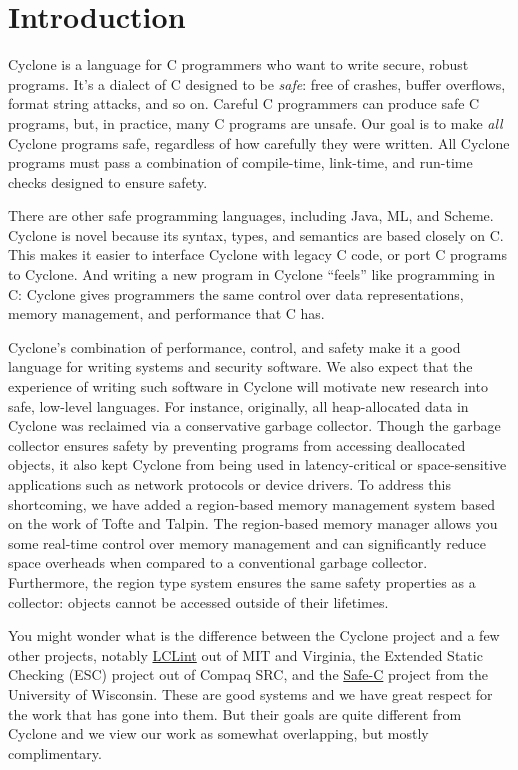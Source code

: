 \section{Introduction}
Cyclone is a language for C programmers who want to write secure,
robust programs.  It's a dialect of C designed to be \emph{safe}: free
of crashes, buffer overflows, format string attacks, and so on.
Careful C programmers can produce safe C programs, but, in practice,
many C programs are unsafe.  Our goal is to make \emph{all} Cyclone
programs safe, regardless of how carefully they were written.  All
Cyclone programs must pass a combination of compile-time, link-time,
and run-time checks designed to ensure safety.

There are other safe programming languages, including Java, ML, and
Scheme.  Cyclone is novel because its syntax, types, and semantics are
based closely on C\@.  This makes it easier to interface Cyclone with
legacy C code, or port C programs to Cyclone.  And writing a new
program in Cyclone ``feels'' like programming in C: Cyclone gives
programmers the same control over data representations, memory
management, and performance that C has.

Cyclone's combination of performance, control, and safety make it a
good language for writing systems and security software.  We also
expect that the experience of writing such software in Cyclone will
motivate new research into safe, low-level languages.  For instance,
originally, all heap-allocated data in Cyclone was reclaimed via a
conservative garbage collector.  Though the garbage collector ensures
safety by preventing programs from accessing deallocated objects, it
also kept Cyclone from being used in latency-critical or
space-sensitive applications such as network protocols or device
drivers.  To address this shortcoming, we have added a region-based
memory management system based on the work of Tofte and Talpin.  The
region-based memory manager allows you some real-time control over
memory management and can significantly reduce space overheads when
compared to a conventional garbage collector.  Furthermore, the region
type system ensures the same safety properties as a collector: objects
cannot be accessed outside of their lifetimes.

You might wonder what is the difference between the Cyclone project
and a few other projects, notably
\href{http://lclint.cs.virginia.edu/}{LCLint} out of MIT and Virginia,
the Extended Static Checking (ESC) project out of Compaq SRC, and the
\href{http://www.cs.wisc.edu/~austin/scc.html}{Safe-C} project from
the University of Wisconsin.  These are good systems and we have great
respect for the work that has gone into them.  But their goals are
quite different from Cyclone and we view our work as somewhat
overlapping, but mostly complimentary.

